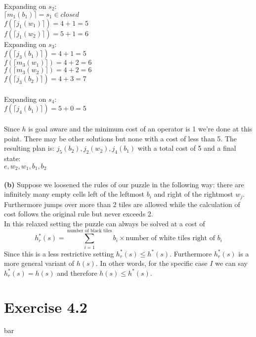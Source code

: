 \documentclass[11pt,a4paper]{article}
\begin{document}
Expanding on $s_2$:\\
$\lceil m_1(b_1)\rceil=s_1\in closed$\\
$f(\lceil j_1(w_1)\rceil)=4+1=5$\\
$f(\lceil j_1(w_2)\rceil)=5+1=6$\\
Expanding on $s_3$:\\
$f(\lceil j_3(b_1)\rceil)=4+1=5$\\
$f(\lceil m_3(w_1)\rceil)=4+2=6$\\
$f(\lceil m_3(w_2)\rceil)=4+2=6$\\
$f(\lceil j_3(b_2)\rceil)=4+3=7$\\
\\
Expanding on $s_4$:\\
$f(\lceil j_4(b_1)\rceil)=5+0=5$\\
\\
Since $h$ is goal aware and the minimum cost of an operator is 1 we're done at this point. There may be other solutions but none with a cost of less than 5. The resulting plan is: $j_5(b_2),j_2(w_2),j_4(b_1)$ with a total cost of 5 and a final state:\\
$e,w_2,w_1,b_1,b_2$\\
\\
\textbf{(b)} Suppose we loosened the rules of our puzzle in the following way: there are infinitely many empty cells left of the leftmost $b_i$ and right of the rightmost $w_j$. Furthermore jumps over more than 2 tiles are allowed while the calculation of cost follows the original rule but never exceeds 2.\\
In this relaxed setting the puzzle can always be solved at a cost of\\
\begin{equation*}
h_r^*(s) = \sum_{i=1}^{\text{number of black tiles}} b_i\times \text{number of white tiles right of }b_i
\end{equation*}
Since this is a less restrictive setting $h_r^*(s)\leq h^*(s)$. Furthermore $h_r^*(s)$ is a more general variant of $h(s)$. In other words, for the specific case $I$ we can say $h_r^*(s)=h(s)$ and therefore $h(s)\leq h^*(s)$.

\section*{Exercise 4.2}
bar
\end{document}

